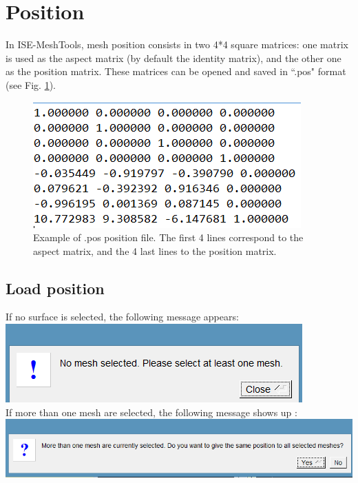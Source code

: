 \section{Position}
In ISE-MeshTools, mesh position consists in two
4*4 square matrices: one matrix is used as the
aspect matrix (by default the identity matrix),
and the other one as the position matrix. These
matrices can be opened and saved in ``.pos"
format (see Fig. \ref{position_file}).


\begin{figure}
  \centering
  \includegraphics[scale=0.5]{images/File/Position_file.png}
 \caption{Example of .pos position file. The first 4 lines correspond
to the aspect matrix, and the 4 last lines to the position matrix.}
\label{position_file}
\end{figure}
 



\subsection{Load position}
If no surface is selected, the following message
appears:\\
\includegraphics[scale=0.5]{images/File/open_position1.png}
\\
If more than one mesh are selected, the following message shows up :\\
\includegraphics[scale=0.5]{images/File/open_position2.png}

